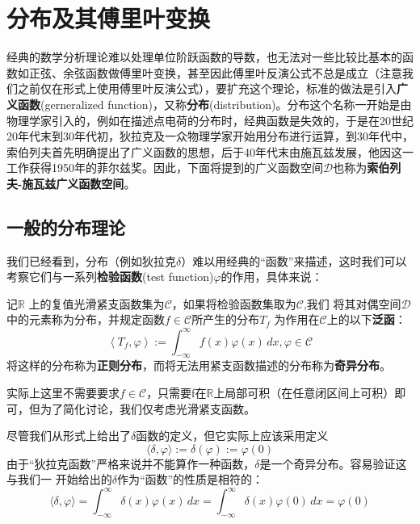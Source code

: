 \section{分布及其傅里叶变换}\label{sec:Distributions}

经典的数学分析理论难以处理单位阶跃函数的导数，也无法对一些比较比基本的函数如正弦、余弦函数做傅里叶变换，甚至因此傅里叶反演公式不总是成立（注意我们之前仅在形式上使用傅里叶反演公式），要扩充这个理论，标准的做法是引入\textbf{广义函数}(gerneralized function)，又称\textbf{分布}(distribution)。分布这个名称一开始是由物理学家引入的，例如在描述点电荷的分布时，经典函数是失效的，于是在20世纪20年代末到30年代初，狄拉克及一众物理学家开始用分布进行运算，到30年代中，索伯列夫首先明确提出了广义函数的思想，后于40年代末由施瓦兹发展，他因这一工作获得1950年的菲尔兹奖。因此，下面将提到的广义函数空间$\mathcal{D} $也称为\textbf{索伯列夫-施瓦兹广义函数空间}\cite{zorich}。

\subsection{一般的分布理论}\label{sub:general_distributions}

我们已经看到，分布（例如狄拉克$\delta$）难以用经典的“函数”来描述，这时我们可以
考察它们与一系列\textbf{检验函数}(test function)$\varphi$的作用，具体来说：
\begin{definition}[分布]
记$\mathbb{R}$
上的复值光滑紧支函数集为$\mathcal{C} $，如果将检验函数集取为$\mathcal{C}$,我们
将其对偶空间$\mathcal{D} $中的元素称为分布，并规定函数$f\in \mathcal{C} $所产生的分布$T_f$
为作用在$\mathcal{C}$上的以下\textbf{泛函}：
\begin{equation*}
    \left\langle T_f,\varphi\right\rangle:=\int_{-\infty}^{\infty}f(x)\varphi(x)\,dx,\varphi\in\mathcal{C}
\end{equation*}
将这样的分布称为\textbf{正则分布}，而将无法用紧支函数描述的分布称为\textbf{奇异分布}。
\end{definition}
\begin{remark}
   实际上这里不需要要求$f\in\mathcal{C} $，只需要f在$\mathbb{R}$上局部可积（在任意闭区间上可积）即可，但为了简化讨论，我们仅考虑光滑紧支函数。 
\end{remark}
\begin{example}
    尽管我们从形式上给出了$\delta$函数的定义，但它实际上应该采用定义
\[\langle \delta,\varphi\rangle:=\delta(\varphi):=\varphi(0)\]
由于“狄拉克函数”严格来说并不能算作一种函数，$\delta$是一个奇异分布。容易验证这与我们一
开始给出的$\delta$作为“函数”的性质是相符的：
\[\langle \delta,\varphi\rangle=\int_{-\infty}^{\infty}\delta(x)\varphi(x)\,dx=\int_{-\infty}^{\infty}\delta(x)\varphi(0)\,dx=\varphi(0)\]
\end{example}

